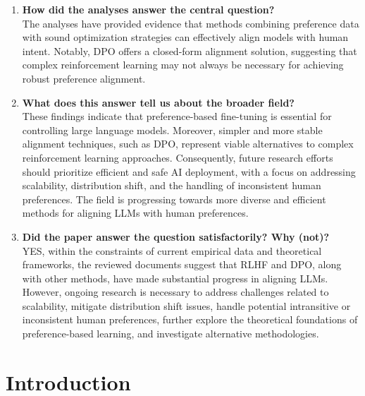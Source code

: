 \documentclass[a4paper,oneside,10pt,ngerman,english]{scrartcl}
\begin{document}
\begin{enumerate}
    \item \textbf{How did the analyses answer the central question?} \\
    The analyses have provided evidence that methods combining preference data with sound optimization strategies can effectively align models with human intent. Notably, DPO offers a closed-form alignment solution, suggesting that complex reinforcement learning may not always be necessary for achieving robust preference alignment.

    \item \textbf{What does this answer tell us about the broader field?} \\
    These findings indicate that preference-based fine-tuning is essential for controlling large language models. Moreover, simpler and more stable alignment techniques, such as DPO, represent viable alternatives to complex reinforcement learning approaches. Consequently, future research efforts should prioritize efficient and safe AI deployment, with a focus on addressing scalability, distribution shift, and the handling of inconsistent human preferences. The field is progressing towards more diverse and efficient methods for aligning LLMs with human preferences.

    \item \textbf{Did the paper answer the question satisfactorily? Why (not)?} \\
    YES, within the constraints of current empirical data and theoretical frameworks, the reviewed documents suggest that RLHF and DPO, along with other methods, have made substantial progress in aligning LLMs. However, ongoing research is necessary to address challenges related to scalability, mitigate distribution shift issues, handle potential intransitive or inconsistent human preferences, further explore the theoretical foundations of preference-based learning, and investigate alternative methodologies.
\end{enumerate}

\cleardoubleoddpage

\section{Introduction}
\label{sec:introduction}
\end{document}
